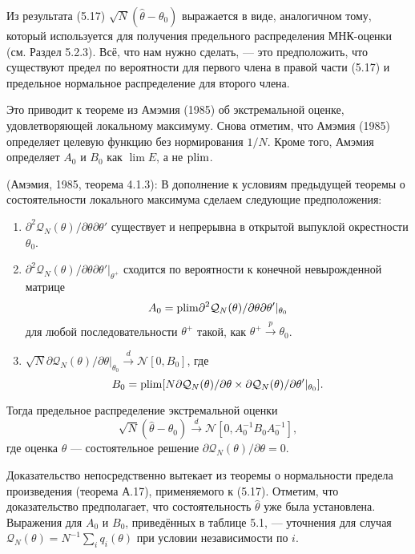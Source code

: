 Из результата (5.17) $\sqrt{N}(\hat{\theta} - \theta_0)$ выражается в виде, аналогичном тому, который используется для получения предельного распределения МНК-оценки (см. Раздел 5.2.3). Всё, что нам нужно сделать, --- это предположить, что существуют предел по вероятности для первого члена в правой части (5.17) и предельное нормальное распределение для второго члена.

Это приводит к теореме из Амэмия (1985) об экстремальной оценке, удовлетворяющей локальному максимуму. Снова отметим, что Амэмия (1985) определяет целевую функцию без нормирования $1/N$. Кроме того, Амэмия определяет $A_0$ и $B_0$ как $\lim E$, а не $\mathrm{plim }$.

\begin{theorem} (Амэмия, 1985, теорема 4.1.3): В дополнение к условиям предыдущей теоремы о состоятельности локального максимума сделаем следующие предположения:
\begin{enumerate}
\item $\partial^2 \mathcal{Q}_N(\theta) / \partial \theta \partial \theta'$ существует и непрерывна в открытой выпуклой окрестности $\theta_0$.
\item $\partial^2 \mathcal{Q}_N(\theta) / \partial \theta \partial \theta'|_{\theta^+}$ сходится по вероятности к конечной невырожденной матрице
\begin{equation}
A_0=\mathrm{plim } \partial^2 \mathcal{Q}_N(\theta) / \partial \theta \partial \theta'|_{\theta_0}
\end{equation}
для любой последовательности $\theta^+$ такой, как $\theta^+ \xrightarrow{p} \theta_0$.
\item $\sqrt{N} \partial \mathcal{Q}_N(\theta) / \partial \theta |_{\theta_0} \xrightarrow{d} \mathcal{N}[0,B_0]$, где
\begin{equation}
B_0=\mathrm{plim }[N \partial \mathcal{Q}_N(\theta) / \partial \theta \times \partial \mathcal{Q}_N(\theta) / \partial \theta'|_{\theta_0}].
\end{equation}
\end{enumerate}
Тогда предельное распределение экстремальной оценки
\begin{equation}
\sqrt{N}(\hat{\theta}-\theta_0) \xrightarrow{d} \mathcal{N}[0,A_0^{-1}B_0A_0^{-1}],
\end{equation}
где оценка $\hat{\theta}$ --- состоятельное решение $\partial \mathcal{Q}_N(\theta) / \partial \theta=0$.
\end{theorem}

Доказательство непосредственно вытекает из теоремы о нормальности предела произведения (теорема А.17), применяемого к (5.17). Отметим, что доказательство предполагает, что состоятельность $\hat{\theta}$ уже была установлена. Выражения для $A_0$ и $B_0$, приведённых в таблице 5.1, --- уточнения для случая $\mathcal{Q}_N(\theta)=N^{-1} \sum_i q_i(\theta)$ при условии независимости по $i$.

